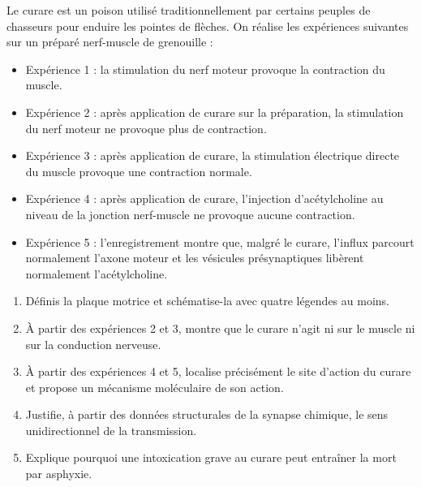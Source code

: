 \documentclass[11pt]{article}
\begin{document}
\begin{exercice}
Le curare est un poison utilisé traditionnellement par certains peuples de chasseurs pour enduire les pointes de flèches. On réalise les expériences suivantes sur un préparé nerf-muscle de grenouille :
\begin{itemize}
\item Expérience 1 : la stimulation du nerf moteur provoque la contraction du muscle.
\item Expérience 2 : après application de curare sur la préparation, la stimulation du nerf moteur ne provoque plus de contraction.
\item Expérience 3 : après application de curare, la stimulation électrique directe du muscle provoque une contraction normale.
\item Expérience 4 : après application de curare, l'injection d'acétylcholine au niveau de la jonction nerf-muscle ne provoque aucune contraction.
\item Expérience 5 : l'enregistrement montre que, malgré le curare, l'influx parcourt normalement l'axone moteur et les vésicules présynaptiques libèrent normalement l'acétylcholine.
\end{itemize}

\begin{enumerate}
\item Définis la plaque motrice et schématise-la avec quatre légendes au moins.
\item À partir des expériences 2 et 3, montre que le curare n'agit ni sur le muscle ni sur la conduction nerveuse.
\item À partir des expériences 4 et 5, localise précisément le site d'action du curare et propose un mécanisme moléculaire de son action.
\item Justifie, à partir des données structurales de la synapse chimique, le sens unidirectionnel de la transmission.
\item Explique pourquoi une intoxication grave au curare peut entraîner la mort par asphyxie.
\end{enumerate}
\end{exercice}
\end{document}
